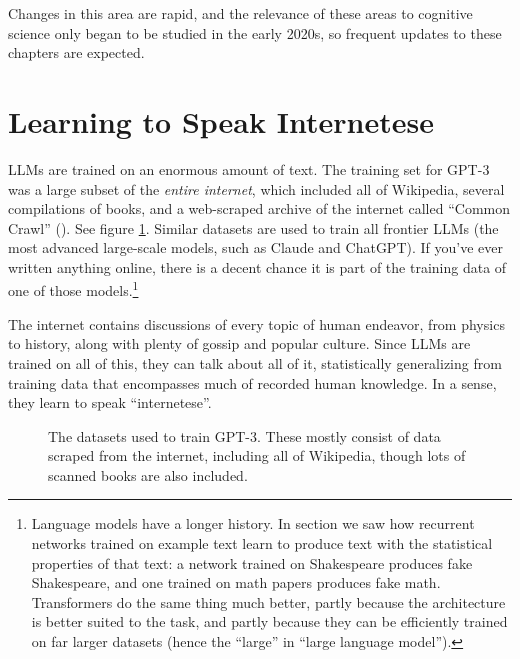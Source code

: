 Changes in this area are rapid, and the relevance of these areas to cognitive
science only began to be studied in the early 2020s, so frequent updates to these chapters are expected.

\section{Learning to Speak Internetese}\label{internetese}


LLMs are trained on an enormous amount of text. The training set for GPT-3 was
a large subset of the \emph{entire internet}, which included all of Wikipedia,
several compilations of books, and a web-scraped archive of the internet called
``Common Crawl'' (). See
figure \ref{gptDatasets}. Similar datasets are used to train all frontier LLMs (the most advanced
large-scale models, such as Claude and ChatGPT).
If you've ever written anything online, there is a decent chance it is part of
the training data of one of those models.\footnote{Language models have a
longer history. In section  we saw how
recurrent networks trained on example text learn to produce text with the
statistical properties of that text: a network trained on Shakespeare produces
fake Shakespeare, and one trained on math papers produces fake math.
Transformers do the same thing much better, partly because the architecture is
better suited to the task, and partly because they can be efficiently trained on
far larger datasets (hence the ``large'' in ``large language model'').}

The internet contains discussions of every topic of human endeavor, from physics
to history, along with plenty of gossip and popular culture. Since LLMs are
trained on all of this, they can talk about all of it, statistically
generalizing from training data that encompasses much of recorded human
knowledge. In a sense, they learn to speak ``internetese''.

\begin{figure}[ht]
\centering
{}
\caption[From \cite{brown2020language}.]{The datasets used to train GPT-3.
These mostly consist of data scraped from the internet, including all of
Wikipedia, though lots of scanned books are also included.}
\label{gptDatasets}
\end{figure}

